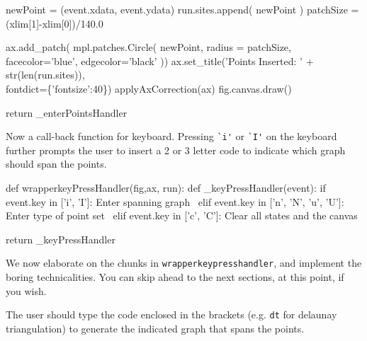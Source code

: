              newPoint = (event.xdata, event.ydata)
             run.sites.append( newPoint  )
             patchSize  = (xlim[1]-xlim[0])/140.0
                   
             ax.add_patch( mpl.patches.Circle( newPoint, radius = patchSize,
                                               facecolor='blue', edgecolor='black'  ))
             ax.set_title('Points Inserted: ' + str(len(run.sites)), \\
                           fontdict=\{'fontsize':40\})
             applyAxCorrection(ax)
             fig.canvas.draw()

    return _enterPointsHandler
\nwendcode{}\nwdocspar

Now a call-back function for keyboard. Pressing \verb|`i'| or \verb|`I'| on the keyboard further prompts the 
user to insert a 2 or 3 letter code to indicate which graph should span the points. 

\nwenddocs{}\plusendmoddef\nwstartdeflinemarkup{}\nwenddeflinemarkup
def wrapperkeyPressHandler(fig,ax, run): 
       def _keyPressHandler(event):
               if event.key in ['i', 'I']:                     
                     \LA{}Enter spanning graph~{\nwtagstyle{}}\RA{}    
               elif event.key in ['n', 'N', 'u', 'U']: 
                     \LA{}Enter type of point set~{\nwtagstyle{}}\RA{}                   
               elif event.key in ['c', 'C']: 
                     \LA{}Clear all states and the canvas~{\nwtagstyle{}}\RA{}
                   
       return _keyPressHandler
\nwendcode{}\nwdocspar

We now elaborate on the chunks in \verb|wrapperkeypresshandler|, and implement the boring technicalities. You 
can skip ahead to the next sections, at this point, if you wish. 

The user should type the code enclosed in the brackets (e.g. \verb|dt| for delaunay triangulation) to generate the 
indicated graph that spans the points. 

